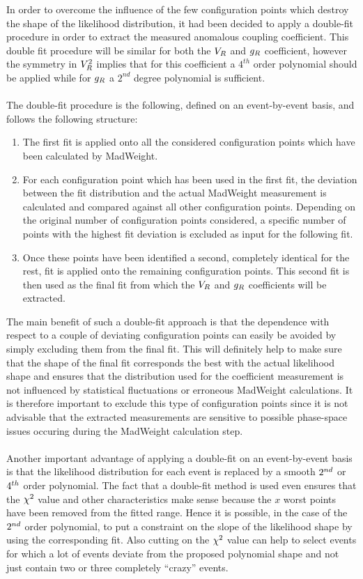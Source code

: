 In order to overcome the influence of the few configuration points which destroy the shape of the likelihood distribution, it had been decided to apply a double-fit procedure in order to extract the measured anomalous coupling coefficient.
This double fit procedure will be similar for both the $V_{R}$ and $g_{R}$ coefficient, however the symmetry in $V_{R}^{2}$ implies that for this coefficient a $4^{th}$ order polynomial should be applied while for $g_{R}$ a $2^{nd}$ degree polynomial is sufficient.
\\
\\
The double-fit procedure is the following, defined on an event-by-event basis, and follows the following structure:
\begin{enumerate}
 \item The first fit is applied onto all the considered configuration points which have been calculated by MadWeight.
 \item For each configuration point which has been used in the first fit, the deviation between the fit distribution and the actual MadWeight measurement is calculated and compared against all other configuration points. Depending on the original number of configuration points considered, a specific number of points with the highest fit deviation is excluded as input for the following fit.
 \item Once these points have been identified a second, completely identical for the rest, fit is applied onto the remaining configuration points. This second fit is then used as the final fit from which the $V_{R}$ and $g_{R}$ coefficients will be extracted.
\end{enumerate}
The main benefit of such a double-fit approach is that the dependence with respect to a couple of deviating configuration points can easily be avoided by simply excluding them from the final fit.
This will definitely help to make sure that the shape of the final fit corresponds the best with the actual likelihood shape and ensures that the distribution used for the coefficient measurement is not influenced by statistical fluctuations or erroneous MadWeight calculations.
It is therefore important to exclude this type of configuration points since it is not advisable that the extracted measurements are sensitive to possible phase-space issues occuring during the MadWeight calculation step.
\\
\\
Another important advantage of applying a double-fit on an event-by-event basis is that the likelihood distribution for each event is replaced by a smooth $2^{nd}$ or $4^{th}$ order polynomial. The fact that a double-fit method is used even ensures that the $\chi^{2}$ value and other characteristics make sense because the $x$ worst points have been removed from the fitted range. Hence it is possible, in the case of the $2^{nd}$ order polynomial, to put a constraint on the slope of the likelihood shape by using the corresponding fit. Also cutting on the $\chi^{2}$ value can help to select events for which a lot of events deviate from the proposed polynomial shape and not just contain two or three completely ``crazy'' events.

